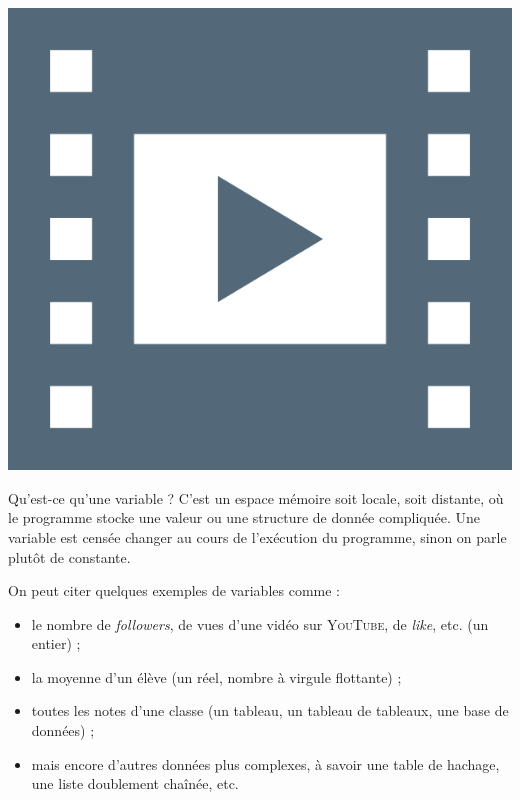 \begin{marginvideo}
	[\label{vid:VI.2}Variables.]%
	\href{https://www.youtube.com/watch?v=0HicfcczN40}%
	  {\includegraphics[width=\marginparwidth]{./Images/Pictograms/film-strip-dark-electric-blue.png}}%
\end{marginvideo}

Qu'est-ce qu'une variable ? C'est un espace mémoire soit locale, soit distante, où le programme stocke une valeur ou une structure de donnée compliquée. Une variable est censée changer au cours de l'exécution du programme, sinon on parle plutôt de constante.

On peut citer quelques exemples de variables comme :
\begin{itemize}
\item  le nombre de \textit{followers}, de vues d'une vidéo sur \textsc{YouTube}, de \textit{like}, etc. (un entier) ;
\item la moyenne d'un élève (un réel, nombre à virgule flottante) ;
\item toutes les notes d'une classe (un tableau, un tableau de tableaux, une base de données) ;
\item mais encore d'autres données plus complexes, à savoir une table de hachage, une liste doublement chaînée, etc.
\end{itemize}

